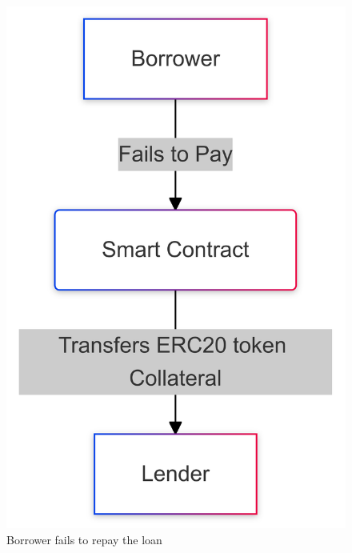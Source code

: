 \documentclass[11pt,a4paper,titlepage]{scrartcl}
\begin{document}
\begin{figure}[ht]
\begin{minipage}[t]{0.3\textwidth}
        \includegraphics[width=\textwidth]{image/otcfailtopay}
        \caption{Borrower fails to repay the loan}
        \label{fig:fails}
    \end{minipage}
    \FloatBarrier
\end{figure}
\end{document}
